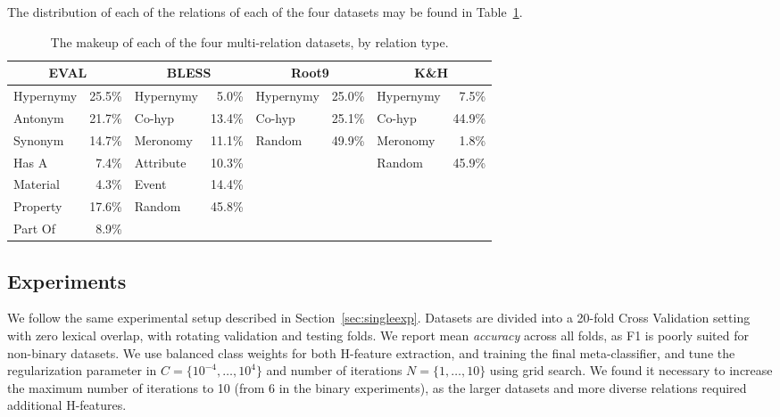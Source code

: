 The distribution of each of the relations of each of the four datasets may
be found in Table~\ref{tab:multimakeup}.

\begin{table}
\centering
\begin{footnotesize}
\begin{tabular}{|lr|lr|lr|lr|}
  \hline
  \multicolumn{2}{|c|}{{\bf EVAL}} & \multicolumn{2}{c|}{{\bf BLESS}} & \multicolumn{2}{c|}{{\bf Root9}} & \multicolumn{2}{c|}{{\bf K\&H}}\\
  \hline
  \hline
  Hypernymy & 25.5\% & Hypernymy   &  5.0\% & Hypernymy   & 25.0\% & Hypernymy   &  7.5\% \\
  Antonym   & 21.7\% & Co-hyp      & 13.4\% & Co-hyp      & 25.1\% & Co-hyp      & 44.9\% \\
  Synonym   & 14.7\% & Meronomy    & 11.1\% & Random      & 49.9\% & Meronomy    &  1.8\% \\
  Has A     &  7.4\% & Attribute   & 10.3\% &             &        & Random      & 45.9\% \\
  Material  &  4.3\% & Event       & 14.4\% &             &        &             &        \\
  Property  & 17.6\% & Random      & 45.8\% &             &        &             &        \\
  Part Of   &  8.9\% &             &        &             &        &             &        \\
  \hline
\end{tabular}
\end{footnotesize}
\caption{The makeup of each of the four multi-relation datasets, by relation type.}
\label{tab:multimakeup}
\end{table}

\subsection{Experiments}

We follow the same experimental setup described in Section~\ref{sec:singleexp}.
Datasets are divided into a 20-fold Cross Validation setting with zero lexical
overlap, with rotating validation and testing folds. We report mean {\em
accuracy} across all folds, as F1 is poorly suited for non-binary datasets.
We use balanced class weights for both H-feature extraction, and training
the final meta-classifier, and tune the regularization parameter in
$C = \{10^{-4}, \ldots, 10^{4}\}$ and number of iterations $N = \{1, \ldots,
10\}$ using grid search. We found it necessary to increase the maximum number
of iterations to 10 (from 6 in the binary experiments), as the larger datasets
and more diverse relations required additional H-features.

